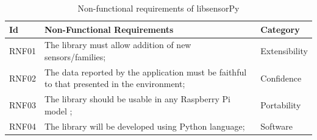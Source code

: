 \documentclass{acm_proc_article-sp}
\begin{document}
\begin{table}[h]
 \caption{Non-functional requirements of libsensorPy}
 \label{table:rnf}
 \begin{tabular}{|l|p{4.7cm}|l|}
 \hline  
 Id & Non-Functional Requirements & Category \\
 \hline  
 RNF01 & The library must allow addition of new sensors/families; & Extensibility\\
 \hline  
 RNF02 & The data reported by the application must be faithful to that presented in the environment; & Confidence \\
 \hline 
 RNF03 & The library should be usable in any Raspberry Pi model ; & Portability \\
 \hline 
 RNF04 & The library will be developed using Python language; & Software \\
\hline  
\end{tabular}
\end{table}

\end{document}
